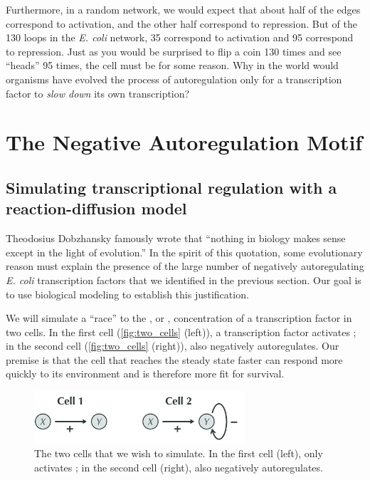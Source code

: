 Furthermore, in a random network, we would expect that about half of the edges correspond to activation, and the other half correspond to repression. But of the 130 loops in the \textit{E. coli} network, 35 correspond to activation and 95 correspond to repression. Just as you would be surprised to flip a coin 130 times and see ``heads'' 95 times, the cell must be  for some reason. Why in the world would organisms have evolved the process of autoregulation only for a transcription factor to \textit{slow down} its own transcription?\\


\FloatBarrier
{}
\section{The Negative Autoregulation Motif}
\label{sec:the_negative_autoregulation_motif}

\subsection{Simulating transcriptional regulation with a reaction-diffusion model}

Theodosius Dobzhansky famously wrote that ``nothing in biology makes sense except in the light of evolution.'' In the spirit of this quotation, some evolutionary reason must explain the presence of the large number of negatively autoregulating \textit{E. coli} transcription factors that we identified in the previous section. Our goal is to use biological modeling to establish this justification.

We will simulate a ``race'' to the , or , concentration of a transcription factor  in two cells. In the first cell (\autoref{fig:two_cells} (left)), a transcription factor  activates ; in the second cell (\autoref{fig:two_cells} (right)),  also negatively autoregulates. Our premise is that the cell that reaches the steady state faster can respond more quickly to its environment and is therefore more fit for survival.\\

\begin{figure}[h]
\centering
\mySfFamily
\includegraphics[width = 0.7\textwidth]{../images_CMYK/two_cells}
\caption{The two cells that we wish to simulate. In the first cell (left),  only activates ; in the second cell (right),  also negatively autoregulates.}
\label{fig:two_cells}
\end{figure}

